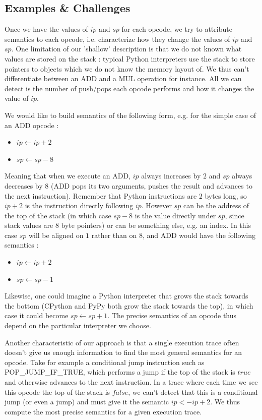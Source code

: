 \documentclass[english]{article}
\begin{document}
\subsection{Examples \& Challenges}

Once we have the values of $ip$ and $sp$ for each opcode, we try to attribute semantics to each opcode, i.e. characterize how they change the values of $ip$ and $sp$. One limitation of our 'shallow' description is that we do not known what values are stored on the stack : typical Python interpreters use the stack to store pointers to objects which we do not know the memory layout of. We thus can't differentiate between an ADD and a MUL operation for instance. All we can detect is the number of push/pops each opcode performs and how it changes the value of $ip$.

We would like to build semantics of the following form, e.g. for the simple case of an ADD opcode :
\begin{itemize}
	\item $ip \leftarrow ip + 2$
	\item $sp \leftarrow sp - 8$
\end{itemize}
Meaning that when we execute an ADD, $ip$ always increases by $2$ and $sp$ always decreases by $8$ (ADD pops its two arguments, pushes the result and advances to the next instruction). Remember that Python instructions are $2$ bytes long, so $ip + 2$ is the instruction directly following $ip$. However $sp$ can be the address of the top of the stack (in which case $sp - 8$ is the value directly under $sp$, since stack values are $8$ byte pointers) or can be something else, e.g. an index. In this case $sp$ will be aligned on $1$ rather than on $8$, and ADD would have the following semantics :
\begin{itemize}
	\item $ip \leftarrow ip + 2$
	\item $sp \leftarrow sp - 1$
\end{itemize}
Likewise, one could imagine a Python interpreter that grows the stack towards the bottom (CPython and PyPy both grow the stack towards the top), in which case it could become $sp \leftarrow sp + 1$. The precise semantics of an opcode thus depend on the particular interpreter we choose.

Another characteristic of our approach is that a single execution trace often doesn't give us enough information to find the most general semantics for an opcode. Take for example a conditional jump instruction such as POP\_JUMP\_IF\_TRUE, which performs a jump if the top of the stack is $true$ and otherwise advances to the next instruction. In a trace where each time we see this opcode the top of the stack is $false$, we can't detect that this is a conditional jump (or even a jump) and must give it the semantic $ip <- ip + 2$. We thus compute the most precise semantics for a given execution trace. 
\end{document}
